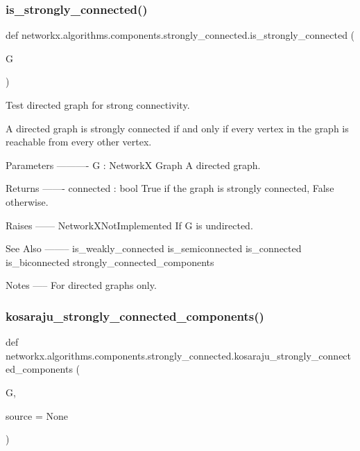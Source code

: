 \subsubsection{\texorpdfstring{is\+\_\+strongly\+\_\+connected()}{is\_strongly\_connected()}}
{\footnotesize\ttfamily def networkx.\+algorithms.\+components.\+strongly\+\_\+connected.\+is\+\_\+strongly\+\_\+connected (\begin{DoxyParamCaption}\item[{}]{G }\end{DoxyParamCaption})}

\begin{DoxyVerb}Test directed graph for strong connectivity.

A directed graph is strongly connected if and only if every vertex in
the graph is reachable from every other vertex.

Parameters
----------
G : NetworkX Graph
   A directed graph.

Returns
-------
connected : bool
  True if the graph is strongly connected, False otherwise.

Raises
------
NetworkXNotImplemented
    If G is undirected.

See Also
--------
is_weakly_connected
is_semiconnected
is_connected
is_biconnected
strongly_connected_components

Notes
-----
For directed graphs only.
\end{DoxyVerb}
 \mbox{\label{namespacenetworkx_1_1algorithms_1_1components_1_1strongly__connected_a52da5da8ec41ba0f6783d2a26007ca54}} 
\subsubsection{\texorpdfstring{kosaraju\+\_\+strongly\+\_\+connected\+\_\+components()}{kosaraju\_strongly\_connected\_components()}}
{\footnotesize\ttfamily def networkx.\+algorithms.\+components.\+strongly\+\_\+connected.\+kosaraju\+\_\+strongly\+\_\+connected\+\_\+components (\begin{DoxyParamCaption}\item[{}]{G,  }\item[{}]{source = {\ttfamily None} }\end{DoxyParamCaption})}

